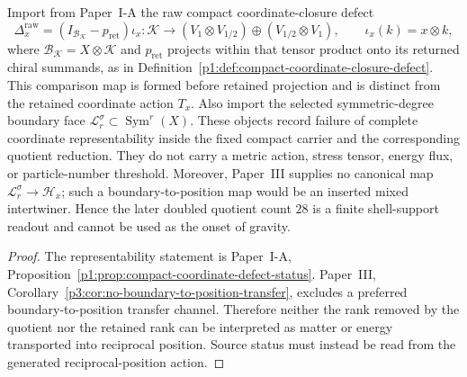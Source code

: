 \documentclass[12pt,a4paper]{article}
\begin{document}
\begin{lemma}
\label{p8:lem:compact-boundary-source-separation}
Import from Paper~I-A the raw compact coordinate-closure defect
\[
  \Delta_x^{\mathrm{raw}}
  =(I_{\mathcal B_{\mathcal K}}-p_{\mathrm{ret}})\iota_x:
  \mathcal K\longrightarrow
  (V_1\otimes V_{1/2})\oplus(V_{1/2}\otimes V_1),
  \qquad \iota_x(k)=x\otimes k,
\]
where \(\mathcal B_{\mathcal K}=X\otimes\mathcal K\) and
\(p_{\mathrm{ret}}\) projects within that tensor product onto its returned
chiral summands, as in
Definition~\ref{p1:def:compact-coordinate-closure-defect}.
This comparison map is formed before retained projection and is distinct
from the retained coordinate action \(T_x\).
Also import the selected symmetric-degree boundary face
\(\mathcal L_r^\sigma\subset\operatorname{Sym}^r(X)\).  These objects record
failure of complete coordinate representability inside the fixed compact
carrier and the corresponding quotient reduction.  They do not carry a
metric action, stress tensor, energy flux, or particle-number threshold.
Moreover, Paper~III supplies no canonical map
\(\mathcal L_r^\sigma\to\mathcal H_x\); such a boundary-to-position map would
be an inserted mixed intertwiner.  Hence the later doubled quotient count
\(28\) is a finite shell-support readout and cannot be used as the onset of
gravity.
\end{lemma}

\begin{proof}
The representability statement is Paper~I-A,
Proposition~\ref{p1:prop:compact-coordinate-defect-status}.  Paper~III,
Corollary~\ref{p3:cor:no-boundary-to-position-transfer}, excludes a preferred
boundary-to-position transfer channel.  Therefore neither the rank removed by
the quotient nor the retained rank can be interpreted as matter or energy
transported into reciprocal position.  Source status must instead be read from
the generated reciprocal-position action.
\end{proof}
\end{document}
